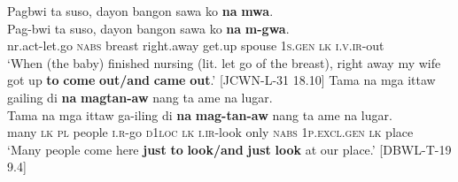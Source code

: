 Pagbwi  ta  suso,  dayon  bangon  sawa  ko  \textbf{na}  \textbf{mwa}. \smallskip\\
\gll Pag-bwi  ta  suso,  dayon  bangon  sawa  ko  \textbf{na}  \textbf{m-gwa}. \\
{nr.act}-let.go  \textsc{nabs}  breast  right.away  get.up  spouse  1\textsc{s.gen}  \textsc{lk}  \textsc{i.v.ir}-out \\
\glt ‘When (the baby) finished nursing (lit. let go of the breast), right away my wife got up \textbf{to} \textbf{come} \textbf{out/and} \textbf{came} \textbf{out}.’ [JCWN-L-31 18.10]
\z
\ea
Tama  na  mga  ittaw  gailing  di  \textbf{na}  \textbf{magtan-aw}  nang ta  ame  na  lugar. \smallskip\\
\gll Tama  na  mga  ittaw  ga-iling  di  \textbf{na}  \textbf{mag-tan-aw}  nang ta  ame  na  lugar. \\
many  \textsc{lk}  \textsc{pl}  people  \textsc{i.r}-go  \textsc{d}1\textsc{loc}  \textsc{lk}  \textsc{i.ir}-look  only
\textsc{nabs}  1\textsc{p.excl.gen}  \textsc{lk}  place \\
\glt `Many people come here \textbf{just} \textbf{to} \textbf{look/and} \textbf{just} \textbf{look} at  our place.’ [DBWL-T-19 9.4]
\z

\newpage

